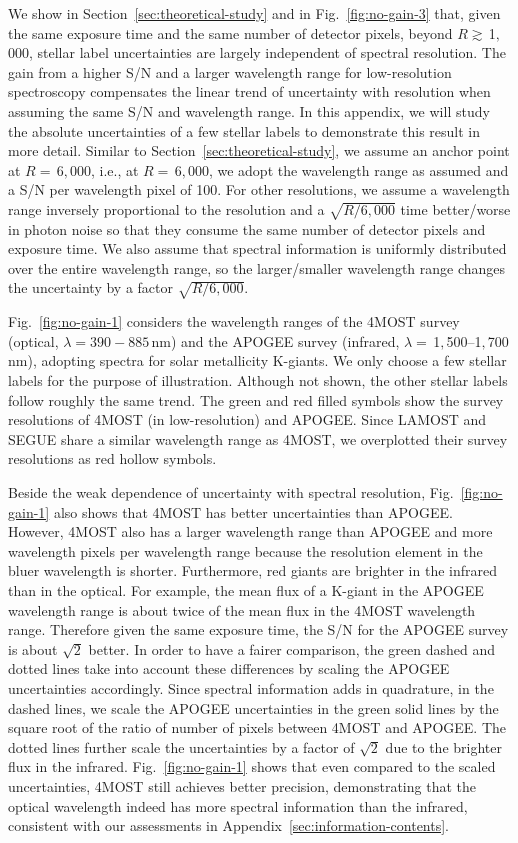 \documentclass[iop]{emulateapj}
\begin{document}
\begin{CJK*}{UTF8}{gbsn}
We show in Section~\ref{sec:theoretical-study} and in Fig.~\ref{fig:no-gain-3} that, given the same exposure time and the same number of detector pixels, beyond $R \gtrsim \,$1$,$000, stellar label uncertainties are largely independent of spectral resolution. The gain from a higher S/N and a larger wavelength range for low-resolution spectroscopy compensates the linear trend of uncertainty with resolution when assuming the same S/N and wavelength range. In this appendix, we will study the absolute uncertainties of a few stellar labels to demonstrate this result in more detail. Similar to Section~\ref{sec:theoretical-study}, we assume an anchor point at $R = \,$6$,$000, i.e., at $R = \,$6$,$000, we adopt the wavelength range as assumed and a S/N per wavelength pixel of 100. For other resolutions, we assume a wavelength range inversely proportional to the resolution and a $\sqrt{R/6,000}$ time better/worse in photon noise so that they consume the same number of detector pixels and exposure time. We also assume that spectral information is uniformly distributed over the entire wavelength range, so the larger/smaller wavelength range changes the uncertainty by a factor $\sqrt{R/6,000}$.

Fig.~\ref{fig:no-gain-1} considers the wavelength ranges of the 4MOST survey (optical, $\lambda = 390 -885 \,$nm) and the APOGEE survey (infrared, $\lambda = \,$1$,$500--1$,$700$\,$nm), adopting spectra for solar metallicity K-giants. We only choose a few stellar labels for the purpose of illustration. Although not shown, the other stellar labels follow roughly the same trend. The green and red filled symbols show the survey resolutions of 4MOST (in low-resolution) and APOGEE. Since LAMOST and SEGUE share a similar wavelength range as 4MOST, we overplotted their survey resolutions as red hollow symbols.

Beside the weak dependence of uncertainty with spectral resolution, Fig.~\ref{fig:no-gain-1} also shows that 4MOST has better uncertainties than APOGEE. However, 4MOST also has a larger wavelength range than APOGEE and more wavelength pixels per wavelength range because the resolution element in the bluer wavelength is shorter. Furthermore, red giants are brighter in the infrared than in the optical. For example, the mean flux of a K-giant in the APOGEE wavelength range is about twice of the mean flux in the 4MOST wavelength range. Therefore given the same exposure time, the S/N for the APOGEE survey is about $\sqrt{2}$ better. In order to have a fairer comparison, the green dashed and dotted lines take into account these differences by scaling the APOGEE uncertainties accordingly. Since spectral information adds in quadrature, in the dashed lines, we scale the APOGEE uncertainties in the green solid lines by the square root of the ratio of number of pixels between 4MOST and APOGEE. The dotted lines further scale the uncertainties by a factor of $\sqrt{2}$ due to the brighter flux in the infrared. Fig.~\ref{fig:no-gain-1} shows that even compared to the scaled uncertainties, 4MOST still achieves better precision, demonstrating that the optical wavelength indeed has more spectral information than the infrared, consistent with our assessments in Appendix~\ref{sec:information-contents}. 


\end{CJK*}
\end{document}
